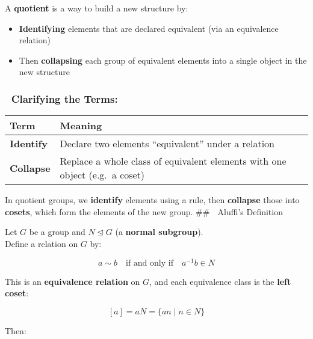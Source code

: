 \documentclass[
]{article}
\providecommand{\tightlist}{%
  \setlength{\itemsep}{0pt}\setlength{\parskip}{0pt}}
\begin{document}
A \textbf{quotient} is a way to build a new structure by:

\begin{itemize}
\tightlist
\item
  \textbf{Identifying} elements that are declared equivalent (via an
  equivalence relation)
\item
  Then \textbf{collapsing} each group of equivalent elements into a
  single object in the new structure
\end{itemize}

\subsubsection{🔁 Clarifying the Terms:}\label{clarifying-the-terms}

\begin{longtable}[]{@{}
  >{\raggedright\arraybackslash}p{}
  >{\raggedright\arraybackslash}p{}@{}}
\toprule\noalign{}
\begin{minipage}[b]{\linewidth}\raggedright
Term
\end{minipage} & \begin{minipage}[b]{\linewidth}\raggedright
Meaning
\end{minipage} \\
\midrule\noalign{}
\endhead
\bottomrule\noalign{}
\endlastfoot
\textbf{Identify} & Declare two elements ``equivalent'' under a
relation \\
\textbf{Collapse} & Replace a whole class of equivalent elements with
one object (e.g.~a coset) \\
\end{longtable}

In quotient groups, we \textbf{identify} elements using a rule, then
\textbf{collapse} those into \textbf{cosets}, which form the elements of
the new group. \#\# 📘 Aluffi's Definition

Let \(G\) be a group and \(N \trianglelefteq G\) (a \textbf{normal
subgroup}).\\
Define a relation on \(G\) by:

\[
a \sim b \quad \text{if and only if} \quad a^{-1}b \in N
\]

This is an \textbf{equivalence relation} on \(G\), and each equivalence
class is the \textbf{left coset}:

\[
[a] = aN = \{ an \mid n \in N \}
\]

Then:
\end{document}
